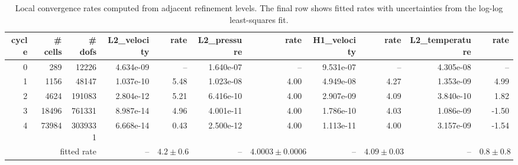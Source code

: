 \begin{table}[htbp]
\centering
\begin{tabular}{|r|r|r|r|r|r|r|r|r|r|r|}
\hline
cycle & \# cells & \# dofs & L2\_velocity & rate & L2\_pressure & rate & H1\_velocity & rate & L2\_temperature & rate \\ \hline
0 & 289 & 12226 & 4.634e-09 & -- & 1.640e-07 & -- & 9.531e-07 & -- & 4.305e-08 & -- \\ \hline
1 & 1156 & 48147 & 1.037e-10 & 5.48 & 1.023e-08 & 4.00 & 4.949e-08 & 4.27 & 1.353e-09 & 4.99 \\ \hline
2 & 4624 & 191083 & 2.804e-12 & 5.21 & 6.416e-10 & 4.00 & 2.907e-09 & 4.09 & 3.840e-10 & 1.82 \\ \hline
3 & 18496 & 761331 & 8.987e-14 & 4.96 & 4.001e-11 & 4.00 & 1.786e-10 & 4.03 & 1.086e-09 & -1.50 \\ \hline
4 & 73984 & 3039331 & 6.668e-14 & 0.43 & 2.500e-12 & 4.00 & 1.113e-11 & 4.00 & 3.157e-09 & -1.54 \\ \hline
\multicolumn{3}{|r|}{fitted rate} & -- & $4.2 \pm 0.6$ & -- & $4.0003 \pm 0.0006$ & -- & $4.09 \pm 0.03$ & -- & $0.8 \pm 0.8$ \\ \hline
\end{tabular}
\caption{Local convergence rates computed from adjacent refinement levels. The final row shows fitted rates with uncertainties from the log-log least-squares fit.}
\end{table}
